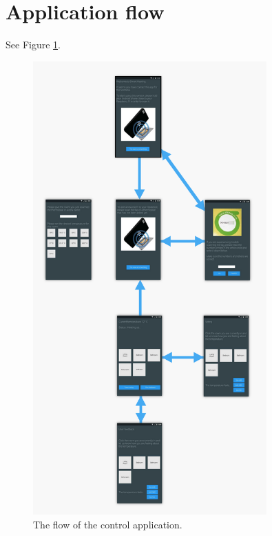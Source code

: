 \section{Application flow}
See Figure \ref{fig:app_flow}.
\begin{figure}[h]
	\begin{center}
		\includegraphics[width=0.8\textwidth]{images/app_flow.png}
	\end{center}
	\caption{The flow of the control application.}
	\label{fig:app_flow}
\end{figure}
